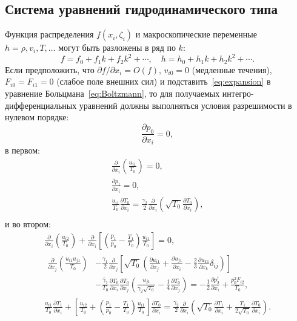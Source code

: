 \documentclass[
aps,%
12pt,%
final,%
notitlepage,%
oneside,%
onecolumn,%
nobibnotes,%
nofootinbib,%
superscriptaddress,%
noshowpacs,%
showkeys,%
centertags]%
{revtex4}
\newcommand{\pder}[2][]{\frac{\partial#1}{\partial#2}}
\newcommand{\Pder}[2][]{\partial#1/\partial#2}
\newcommand{\OO}[1]{O\left(#1\right)}
\begin{document}
\subsection{Система уравнений гидродинамического типа}

Функция распределения \(f(x_i,\zeta_i)\) и макроскопические переменные \(h = \rho, v_i, T, \dots\)
могут быть разложены в ряд по \(k\):
\begin{equation}\label{eq:expansion}
    f = f_0 + f_1k + f_2k^2 + \cdots, \quad h = h_0 + h_1k + h_2k^2 + \cdots.
\end{equation}
Если предположить, что \(\Pder[f]{x_i} = \OO{f}\),
\(v_{i0} = 0\) (медленные течения), \(F_{i0} = F_{i1} = 0\) (слабое поле внешних сил)
и подставить~\eqref{eq:expansion} в уравнение Больцмана~\eqref{eq:Boltzmann},
то для получаемых интегро-дифференциальных уравнений должны выполняться
условия разрешимости в нулевом порядке:
\begin{equation}
    \pder[p_0]{x_i} = 0, \label{eq:asymptotic0_p}
\end{equation}
в первом:
\begin{gather}
    \pder{x_i}\left(\frac{u_{i1}}{T_0}\right) = 0, \label{eq:asymptotic1_u} \\
    \pder[p_1]{x_i} = 0, \label{eq:asymptotic1_p} \\
    \frac{u_{i1}}{T_0}\pder[T_0]{x_i}
        = \frac{\gamma_2}2\pder{x_i}\left(\sqrt{T_0}\pder[T_0]{x_i}\right), \label{eq:asymptotic1_T} \\
\end{gather}
и во втором:
\begin{gather}
    \pder{x_i}\left(\frac{u_{i2}}{T_0}\right)
        + \pder{x_i}\left[\left(\frac{p_1}{p_0}-\frac{T_1}{T_0}\right)\frac{u_{i1}}{T_0}\right] = 0, \label{eq:asymptotic2_u} \\
    \begin{aligned}
    \pder{x_j}\left(\frac{u_{i1}u_{j1}}{T_0}\right)
        &-\frac{\gamma_1}2\pder{x_j}\left[\sqrt{T_0}\left(
            \pder[u_{i1}]{x_j} + \pder[u_{j1}]{x_i} - \frac23\pder[u_{k1}]{x_k}\delta_{ij}
        \right)\right] \\
        &- \frac{\bar{\gamma}_7}{T_0}\pder[T_0]{x_i}\pder[T_0]{x_j}\left(\frac{u_{j1}}{\gamma_2\sqrt{T_0}} - \frac{1}4\pder[T_0]{x_j}\right)
        = -\frac12\pder[p_2^\dag]{x_i} + \frac{p_0^2 F_{i2}}{T_0},
    \end{aligned} \label{eq:asymptotic2_p} \\
    \frac{u_{i1}}{T_0}\pder[T_1]{x_i}
        + \left[\frac{u_{i2}}{T_0} + \left(\frac{p_1}{p_0}-\frac{T_1}{T_0}\right)\frac{u_{i1}}{T_0}\right]\pder[T_0]{x_i}
        = \frac{\gamma_2}2\pder{x_i}\left(\sqrt{T_0}\pder[T_1]{x_i} + \frac{T_1}{2\sqrt{T_0}}\pder[T_0]{x_i}\right). \label{eq:asymptotic2_T}
\end{gather}
\end{document}

